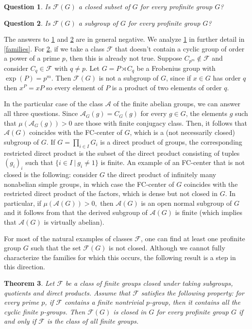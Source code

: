\documentclass{amsart}
\newtheorem{thm}{Theorem}
\newtheorem{question}[thm]{Question} \newtheorem{con}[thm]{Conjecture}
\numberwithin{equation}{section}
\begin{document}
\begin{question}\label{q2}Is $\mathcal F(G)$ a closed  subset of $G$ for every profinite group $G$?
\end{question}

\begin{question}\label{q3}Is $\mathcal F(G)$ a subgroup of $G$ for every profinite group $G$?
\end{question}

The answers to \cref{q2} and \cref{q3} are in general negative. We analyze \cref{q2} in further detail in \cref{families}. For \cref{q3}, if we take a class $\mathcal F$ that doesn't contain a cyclic group of order a power of a prime $p$, then this is already not true. Suppose $C_{p^m} \notin \mathcal F$ and consider $C_q \in \mathcal F$ with $q\neq p$. Let $G=P \rtimes C_q$ be a Frobenius group with $\exp(P)=p^m$. Then $\mathcal F(G)$ is not a subgroup of $G$, since if $x \in G$ has order $q$ then $x^P=xP$ so every element of $P$ is a product of two elements of order $q$.

In the particular case of the class $\mathcal A$ of the finite abelian groups, we can answer all three questions. Since $\mathcal A_G(g)=C_G(g)$ for every $g\in G$, the elements $g$ such that $\mu(\mathcal A_G(g))>0$ are those with finite conjugacy class. Then, it follows that $\mathcal A(G)$ coincides with the FC-center of $G$, which is a (not necessarily closed) subgroup of $G$. If $G=\prod_{i \in I} G_i$ is a direct product of groups, the corresponding restricted direct product is the subset of the direct product consisting of tuples $(g_i)_i$ such that $\{i \in I\ |\ g_i \neq 1\}$ is finite. An example of an FC-center that is not closed is the following: consider $G$ the direct product of infinitely many nonabelian simple groups, in which case the FC-center of $G$ coincides with the restricted direct product of the factors, which is dense but not closed in $G.$ In particular, if $\mu(\mathcal A(G))>0,$ then $\mathcal A(G)$ is an open normal subgroup of $G$ and it follows from \cite[Lemma 2.6]{sh} that the derived subgroup of $\mathcal A(G)$ is finite (which implies that  $\mathcal A(G)$ is virtually abelian). 

For most of the natural examples of classes $\mathcal F$, one can find at least one profinite group $G$ such that the set $\mathcal F(G)$ is not closed. Although we cannot fully characterize the families for which this occurs, the following result is a step in this direction.

\begin{thm}\label{allfingrps}
Let $\mathcal F$ be a class of finite groups closed under taking subgroups, quotients and direct products. Assume that $\mathcal F$ satisfies the following property: for every prime $p$, if $\mathcal F$ contains a finite nontrivial $p$-group, then it contains all the cyclic finite $p$-groups. Then $\mathcal{F}(G)$ is closed in $G$ for every profinite group $G$ if and only if $\mathcal F$ is the class of all finite groups.
\end{thm}
\end{document}
